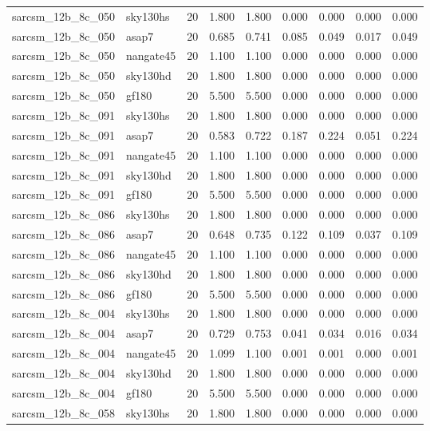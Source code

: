 \begin{tabular}{llrrrrrrr}
sarcsm\_12b\_8c\_050 & sky130hs & 20 & 1.800 & 1.800 & 0.000 & 0.000 & 0.000 & 0.000 \\
sarcsm\_12b\_8c\_050 & asap7 & 20 & 0.685 & 0.741 & 0.085 & 0.049 & 0.017 & 0.049 \\
sarcsm\_12b\_8c\_050 & nangate45 & 20 & 1.100 & 1.100 & 0.000 & 0.000 & 0.000 & 0.000 \\
sarcsm\_12b\_8c\_050 & sky130hd & 20 & 1.800 & 1.800 & 0.000 & 0.000 & 0.000 & 0.000 \\
sarcsm\_12b\_8c\_050 & gf180 & 20 & 5.500 & 5.500 & 0.000 & 0.000 & 0.000 & 0.000 \\
sarcsm\_12b\_8c\_091 & sky130hs & 20 & 1.800 & 1.800 & 0.000 & 0.000 & 0.000 & 0.000 \\
sarcsm\_12b\_8c\_091 & asap7 & 20 & 0.583 & 0.722 & 0.187 & 0.224 & 0.051 & 0.224 \\
sarcsm\_12b\_8c\_091 & nangate45 & 20 & 1.100 & 1.100 & 0.000 & 0.000 & 0.000 & 0.000 \\
sarcsm\_12b\_8c\_091 & sky130hd & 20 & 1.800 & 1.800 & 0.000 & 0.000 & 0.000 & 0.000 \\
sarcsm\_12b\_8c\_091 & gf180 & 20 & 5.500 & 5.500 & 0.000 & 0.000 & 0.000 & 0.000 \\
sarcsm\_12b\_8c\_086 & sky130hs & 20 & 1.800 & 1.800 & 0.000 & 0.000 & 0.000 & 0.000 \\
sarcsm\_12b\_8c\_086 & asap7 & 20 & 0.648 & 0.735 & 0.122 & 0.109 & 0.037 & 0.109 \\
sarcsm\_12b\_8c\_086 & nangate45 & 20 & 1.100 & 1.100 & 0.000 & 0.000 & 0.000 & 0.000 \\
sarcsm\_12b\_8c\_086 & sky130hd & 20 & 1.800 & 1.800 & 0.000 & 0.000 & 0.000 & 0.000 \\
sarcsm\_12b\_8c\_086 & gf180 & 20 & 5.500 & 5.500 & 0.000 & 0.000 & 0.000 & 0.000 \\
sarcsm\_12b\_8c\_004 & sky130hs & 20 & 1.800 & 1.800 & 0.000 & 0.000 & 0.000 & 0.000 \\
sarcsm\_12b\_8c\_004 & asap7 & 20 & 0.729 & 0.753 & 0.041 & 0.034 & 0.016 & 0.034 \\
sarcsm\_12b\_8c\_004 & nangate45 & 20 & 1.099 & 1.100 & 0.001 & 0.001 & 0.000 & 0.001 \\
sarcsm\_12b\_8c\_004 & sky130hd & 20 & 1.800 & 1.800 & 0.000 & 0.000 & 0.000 & 0.000 \\
sarcsm\_12b\_8c\_004 & gf180 & 20 & 5.500 & 5.500 & 0.000 & 0.000 & 0.000 & 0.000 \\
sarcsm\_12b\_8c\_058 & sky130hs & 20 & 1.800 & 1.800 & 0.000 & 0.000 & 0.000 & 0.000 \\

\end{tabular}
